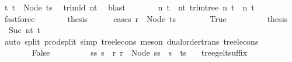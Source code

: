 \begin{isabellebody}
\ t{}{\isacharcolon}{\kern0pt}\ {\isachardoublequoteopen}t{}\ {\isacharequal}{\kern0pt}\ Node\ ts{\isachardoublequoteclose}\ \isamarkupfalse%
\ trim{\isacharunderscore}{\kern0pt}id\ nt{}\ \isamarkupfalse%
\ blast\isanewline
\ \ \ \ \isamarkupfalse%
\ \isamarkupfalse%
\ n{}\ t{}\ \ nt{}{\isacharcolon}{\kern0pt}\ {\isachardoublequoteopen}trim{\isacharunderscore}{\kern0pt}tree\ n{}\ t\ {\isacharequal}{\kern0pt}\ {\isacharparenleft}{\kern0pt}n{}{\isacharcomma}{\kern0pt}\ t{}{\isacharparenright}{\kern0pt}{\isachardoublequoteclose}\ \isamarkupfalse%
\ fastforce\isanewline
\ \ \ \ \isamarkupfalse%
\ \isamarkupfalse%
\ {\isacharquery}{\kern0pt}thesis\isanewline
\ \ \ \ \isamarkupfalse%
\ {\isacharparenleft}{\kern0pt}cases\ {\isachardoublequoteopen}r\ {\isasymle}\ Node\ ts{\isachardoublequoteclose}{\isacharparenright}{\kern0pt}\isanewline
\ \ \ \ \ \ \isamarkupfalse%
\ True\isanewline
\ \ \ \ \ \ \isamarkupfalse%
\ \isamarkupfalse%
\ {\isacharquery}{\kern0pt}thesis\ \isamarkupfalse%
\ {}\ Suc\ nt{}\ t{}\isanewline
\ \ \ \ \ \ \ \ \isamarkupfalse%
\ {\isacharparenleft}{\kern0pt}auto\ split{\isacharcolon}{\kern0pt}\ prod{\isachardot}{\kern0pt}split\ simp{\isacharcolon}{\kern0pt}\ tree{\isacharunderscore}{\kern0pt}le{\isacharunderscore}{\kern0pt}cons{\isacharcomma}{\kern0pt}\ meson\ dual{\isacharunderscore}{\kern0pt}order{\isachardot}{\kern0pt}trans\ tree{\isacharunderscore}{\kern0pt}le{\isacharunderscore}{\kern0pt}cons{\isacharparenright}{\kern0pt}\isanewline
\ \ \ \ \isamarkupfalse%
\isanewline
\ \ \ \ \ \ \isamarkupfalse%
\ False\isanewline
\ \ \ \ \ \ \isamarkupfalse%
\ \isamarkupfalse%
\ ss\ s\ \ r{\isacharcolon}{\kern0pt}\ {\isachardoublequoteopen}r\ {\isacharequal}{\kern0pt}\ Node\ {\isacharparenleft}{\kern0pt}ss\ {\isacharat}{\kern0pt}\ s\ {\isacharhash}{\kern0pt}\ ts{\isacharparenright}{\kern0pt}{\isachardoublequoteclose}\ \isamarkupfalse%
\ {}{\isacharparenleft}{\kern0pt}{}{\isacharparenright}{\kern0pt}\ tree{\isacharunderscore}{\kern0pt}ge{\isacharunderscore}{\kern0pt}lt{\isacharunderscore}{\kern0pt}suffix\isanewline
\ \ \ \ \ \ \ \ \isamarkupfalse%

\end{isabellebody}
